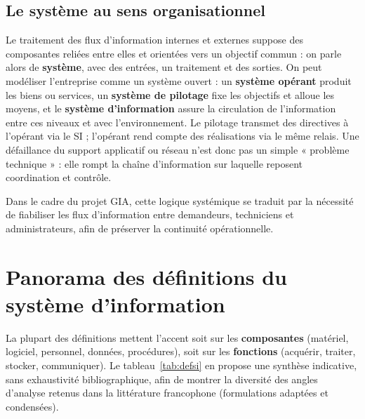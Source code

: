 \subsection{Le système au sens organisationnel}
Le traitement des flux d'information internes et externes suppose des composantes reliées entre
elles et orientées vers un objectif commun : on parle alors de \textbf{système}, avec des entrées,
un traitement et des sorties. On peut modéliser l'entreprise comme un système ouvert : un
\textbf{système opérant} produit les biens ou services, un \textbf{système de pilotage} fixe les
objectifs et alloue les moyens, et le \textbf{système d'information} assure la circulation de
l'information entre ces niveaux et avec l'environnement. Le pilotage transmet des directives à
l'opérant via le SI ; l'opérant rend compte des réalisations via le même relais. Une défaillance
du support applicatif ou réseau n'est donc pas un simple « problème technique » : elle rompt la
chaîne d'information sur laquelle reposent coordination et contrôle.

Dans le cadre du projet GIA, cette logique systémique se traduit par la nécessité de fiabiliser les
flux d'information entre demandeurs, techniciens et administrateurs, afin de préserver la
continuité opérationnelle.

\section{Panorama des définitions du système d'information}
La plupart des définitions mettent l'accent soit sur les \textbf{composantes} (matériel, logiciel,
personnel, données, procédures), soit sur les \textbf{fonctions} (acquérir, traiter, stocker,
communiquer). Le tableau~\ref{tab:defsi} en propose une synthèse indicative, sans exhaustivité
bibliographique, afin de montrer la diversité des angles d'analyse retenus dans la littérature
francophone (formulations adaptées et condensées).

